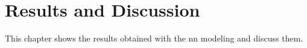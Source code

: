 \chapter{Results and Discussion}\label{sec:results}

This chapter shows the results obtained with the \gls*{nn} modeling and discuss them.

